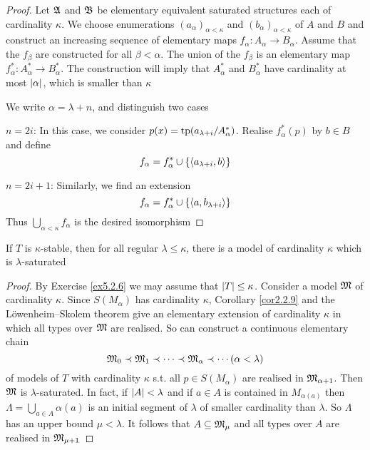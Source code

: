 \documentclass[11pt]{article}
\begin{document}
\begin{proof}
Let \(\mathfrak{A}\) and \(\mathfrak{B}\) be elementary equivalent saturated structures each of cardinality \(\kappa\). We
choose enumerations \((a_\alpha)_{\alpha<\kappa}\) and \((b_\alpha)_{\alpha<\kappa}\) of \(A\) and \(B\) and construct an
increasing sequence of elementary maps \(f_\alpha:A_\alpha\to B_\alpha\). Assume that the \(f_\beta\) are constructed
for all \(\beta<\alpha\). The union of the \(f_\beta\) is an elementary map \(f_\alpha^*:A_\alpha^*\to B_\alpha^*\). The
construction will imply that \(A_\alpha^*\) and \(B_\alpha^*\) have cardinality at most \(\abs{\alpha}\), which
is smaller than \(\kappa\)

We write \(\alpha=\lambda+n\), and distinguish two cases

\(n=2i\): In this case, we consider \(p(x)=\operatorname{tp}(a_{\lambda+i}/A_\alpha^*)\). Realise \(f_\alpha^*(p)\) by \(b\in B\)
and define
\begin{equation*}
f_\alpha=f_\alpha^*\cup\{\langle a_{\lambda+i},b\rangle\}
\end{equation*}

\(n=2i+1\): Similarly, we find an extension
\begin{equation*}
f_\alpha=f_\alpha^*\cup\{\langle a,b_{\lambda+i}\rangle\}
\end{equation*}
Thus \(\bigcup_{\alpha<\kappa}f_\alpha\) is the desired isomorphism
\end{proof}

\begin{lemma}[]
\label{lemma5.2.9}
If \(T\) is \(\kappa\)-stable, then for all regular \(\lambda\le\kappa\), there is a model of cardinality \(\kappa\) which is \(\lambda\)-saturated
\end{lemma}

\begin{proof}
By Exercise \ref{ex5.2.6} we may assume that \(\abs{T}\le\kappa\).  Consider a model \(\mathfrak{M}\) of cardinality
\(\kappa\). Since \(S(M_\alpha)\) has cardinality \(\kappa\), Corollary \ref{cor2.2.9} and the Löwenheim–Skolem theorem
give an elementary extension of cardinality \(\kappa\) in which all types over \(\mathfrak{M}\) are realised. So can
construct a continuous elementary chain
\begin{equation*}
\mathfrak{M}_0\prec\mathfrak{M}_1\prec\dots\prec\mathfrak{M}_\alpha\prec\cdots(\alpha<\lambda)
\end{equation*}
of models of \(T\) with cardinality \(\kappa\) s.t. all \(p\in S(M_\alpha)\) are realised in \(\mathfrak{M}_{\alpha+1}\).
Then \(\mathfrak{M}\) is \(\lambda\)-saturated. In fact, if \(\abs{A}<\lambda\) and if \(a\in A\) is contained in \(M_{\alpha(a)}\)
then \(\Lambda=\bigcup_{a\in A}\alpha(a)\) is an initial segment of \(\lambda\) of smaller cardinality than \(\lambda\).
So \(\Lambda\) has an upper bound \(\mu<\lambda\). It follows that \(A\subseteq\mathfrak{M}_\mu\) and all types over \(A\) are realised
in \(\mathfrak{M}_{\mu+1}\)
\end{proof}
\end{document}
